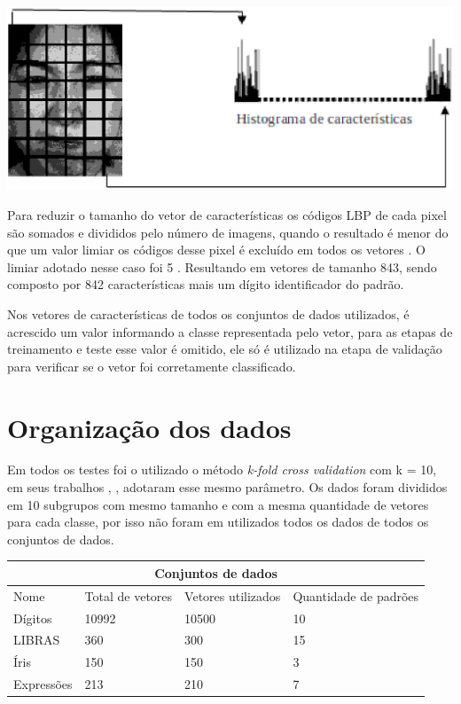 \begin{itemize}
\begin{center}
	\includegraphics[scale=0.5]{graficos/histograma}
	\label{img:LBPHistograma}
\end{center}

Para reduzir o tamanho do vetor de características os códigos LBP de cada pixel são somados e divididos pelo número de imagens, quando o resultado é menor do que um valor limiar os códigos desse pixel é excluído em todos os vetores \cite{Feng}. O limiar adotado nesse caso foi 5 \cite{LBPShan2009}. Resultando em vetores de tamanho 843, sendo composto por 842 características mais um dígito identificador do padrão. 
\end{itemize}

Nos vetores de características de todos os conjuntos de dados utilizados, é acrescido um valor informando a classe representada pelo vetor, para as etapas de treinamento e teste esse valor é omitido, ele só é utilizado na etapa de validação para verificar se o vetor foi corretamente classificado.

\section{Organização dos dados}
Em todos os testes foi o utilizado o método \textit{k-fold cross validation} com k = 10, em seus trabalhos , ,  adotaram esse mesmo parâmetro. Os dados foram divididos em 10 subgrupos com mesmo tamanho \cite{Guo} e com a mesma quantidade de vetores para cada classe, por isso não foram em utilizados todos os dados de todos os conjuntos de dados.

\begin{center}
	\begin{tabular}{|p{2cm}|p{3cm}|p{2cm}|p{2cm}|}
        \hline
        \multicolumn{4}{|c|}{Conjuntos de dados} \\ \hline
        Nome & Total de vetores & Vetores utilizados & Quantidade de padrões\\ \hline
		Dígitos    &10992  & 10500 & 10\\ \hline
		LIBRAS     & 360   & 300   & 15\\ \hline
		Íris       & 150   & 150   & 3\\ \hline
		Expressões & 213   & 210   & 7\\ \hline
	\end{tabular}
	\label{table:org_dados}
\end{center}

